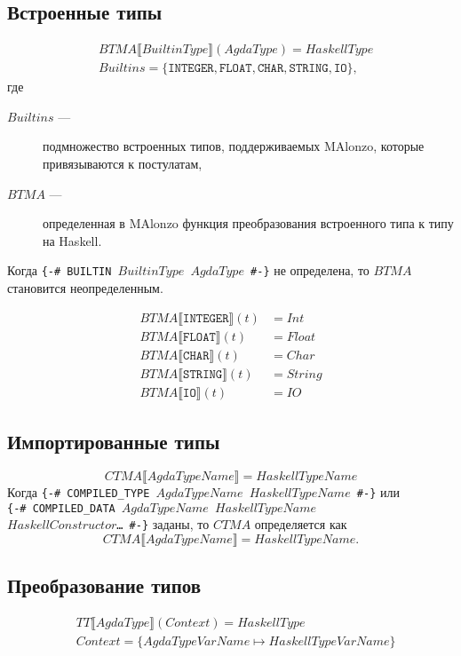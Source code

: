 \subsection{Встроенные типы}
\begin{align*}
&BTMA\llbracket BuiltinType \rrbracket(AgdaType) = HaskellType\\
&Builtins = \{\texttt{INTEGER}, \texttt{FLOAT}, \texttt{CHAR}, \texttt{STRING},
   \texttt{IO}\},
\end{align*}
где
\begin{description}
\item[\(Builtins\) ---] подмножество встроенных типов, поддерживаемых MAlonzo, которые
привязываются к постулатам,
\item[\(BTMA\) ---] определенная в MAlonzo функция преобразования встроенного
типа к типу на Haskell.
\end{description}

Когда \texttt{\{-\# BUILTIN \(BuiltinType\) \(AgdaType\) \#-\}} не определена,
то \(BTMA\) становится неопределенным.

\begin{align*}
BTMA\llbracket \texttt{INTEGER} \rrbracket(t) &= Int\\
BTMA\llbracket \texttt{FLOAT} \rrbracket(t) &= Float\\
BTMA\llbracket \texttt{CHAR} \rrbracket(t) &= Char\\
BTMA\llbracket \texttt{STRING} \rrbracket(t) &= String\\
BTMA\llbracket \texttt{IO} \rrbracket(t) &= IO
\end{align*}

\subsection{Импортированные типы}
\[
CTMA\llbracket AgdaTypeName \rrbracket = HaskellTypeName
\]
Когда \texttt{\{-\# COMPILED\_TYPE \(AgdaTypeName\) \(HaskellTypeName\) \#-\}} или\\
\texttt{\{-\# COMPILED\_DATA \(AgdaTypeName\) \(HaskellTypeName\)\\
\(HaskellConstructor\)\dots\ \#-\}} заданы, то \(CTMA\) определяется как
\[
CTMA\llbracket AgdaTypeName \rrbracket = HaskellTypeName.
\]

\subsection{Преобразование типов}
\begin{align*}
&TT\llbracket AgdaType \rrbracket(Context) = HaskellType\\
&Context = \{ AgdaTypeVarName \mapsto HaskellTypeVarName \}
\end{align*}

